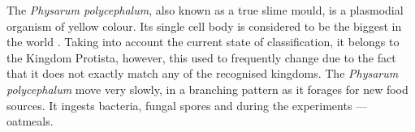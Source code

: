 The \textit{Physarum polycephalum}, also known as a true slime mould, is a plasmodial organism of yellow colour. Its single cell body is considered to be the biggest in the world \cite{stephenson1994myxomycetes}. Taking into account the current state of classification, it belongs to the Kingdom Protista, however, this used to frequently change due to the fact that it does not exactly match any of the recognised kingdoms. The \textit{Physarum polycephalum} move very slowly, in a branching pattern as it forages for new food sources. It ingests bacteria, fungal spores and during the experiments --- oatmeals.








